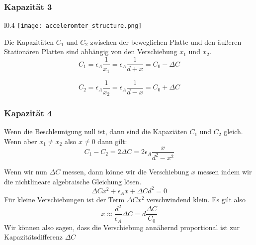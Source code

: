 \documentclass[10pt,a4paper,oneside]{beamer}
\begin{document}


\begin{frame}
	\frametitle{Kapazität 3}

\begin{wrapfigure}{l}{0.4\textwidth}
\texttt{[image: acceleromter\_structure.png]}
\end{wrapfigure}
Die Kapazitäten $C_{1}$ und $C_{2}$ zwischen der beweglichen Platte und den äußeren Stationären Platten sind abhängig von den Verschiebung $x_{1}$ und $x_{2}$.
	\begin{equation}
	C_{1} = \epsilon_{A} \frac{1}{x_{1}} = \epsilon_{A} \frac{1}{d+x} = C_{0} - \Delta C
	\end{equation}
	
	\begin{equation}
	C_{2} = \epsilon_{A} \frac{1}{x_{2}} = \epsilon_{A} \frac{1}{d-x} = C_{0} + \Delta C
	\end{equation}
	
\end{frame}

\begin{frame}
	\frametitle{Kapazität 4}
	
	Wenn die Beschleunigung null ist, dann sind die Kapaziäten $C_{1}$ und $C_{2}$ gleich.
	Wenn aber $x_{1} \neq x_{2}$ also $x \neq 0$ dann gilt:
	\begin{equation}
	C_{1} - C_{2} = 2 \Delta C = 2 \epsilon_{A} \frac{x}{d^{2}-x^{2}}
	\end{equation}
	
	Wenn wir nun $\Delta C$ messen, dann könne wir die Verschiebung $x$ messen indem wir die nichtlineare algebraische Gleichung lösen.
	\begin{equation}
	\Delta C x^{2} + \epsilon_{A} x + \Delta C d^{2} = 0
	\end{equation}
	Für kleine Verschiebungen ist der Term $\Delta C x^{2}$ verschwindend klein. Es gilt also
	\begin{equation}
	x \approx \frac{d^{2}}{\epsilon_{A}} \Delta C = d \frac{\Delta C}{C_{0}}
	\end{equation}
	Wir können also sagen, dass die Verschiebung annähernd proportional ist zur Kapazitätsdifferenz $\Delta C$
\end{frame}
\end{document}
